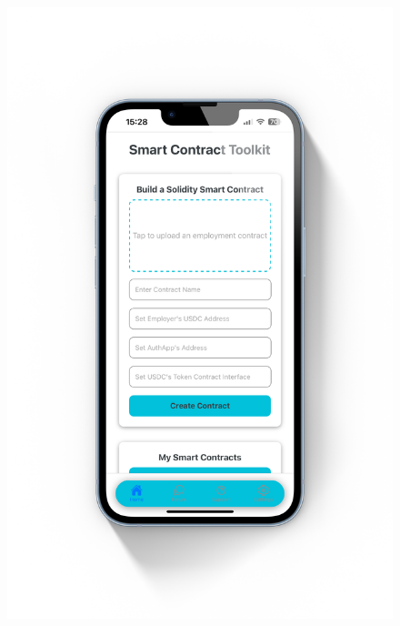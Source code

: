 \begin{figure}[!ht]
    \centering
    \begin{minipage}{0.5\textwidth}
        \centering
        \includegraphics[scale=0.08]{LATEX/Appendices/Images/Software/Frontend/home_screen_1.png}
        \label{fig:home screen 1}
    \end{minipage}\hfill %
    \begin{minipage}{0.5\textwidth}
        \centering

\end{minipage}
\end{figure}
